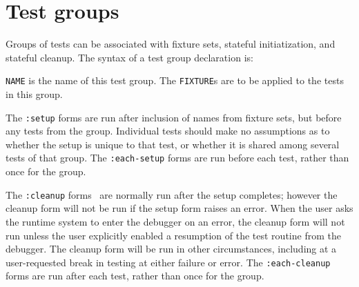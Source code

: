 
\section{Test groups}
Groups of tests can be
associated with fixture sets, stateful initiatization, and stateful
cleanup.  The syntax of a test group declaration
is:

%
\texttt{NAME} is the name of this test group.  The \texttt{FIXTURE}s
are to be applied to the tests in this group.

The \texttt{:setup} forms are run after
inclusion of names from fixture sets, but before any tests from the
group.  Individual tests should make no assumptions as to whether the
setup is unique to that test, or whether it is shared among several
tests of that group.  The \texttt{:each-setup} forms are run before
each test, rather than once for the group.

The \texttt{:cleanup} forms~ are
normally run after the setup completes; however the cleanup form will
not be run if the setup form raises an error.  When the user asks the
runtime system to enter the debugger on an error, the cleanup form
will not run unless the user explicitly enabled a resumption of the
test routine from the debugger.  The cleanup form will be run in other
circumstances, including at a user-requested break in testing at
either failure or error.  The \texttt{:each-cleanup} forms are run
after each test, rather than once for the group.

